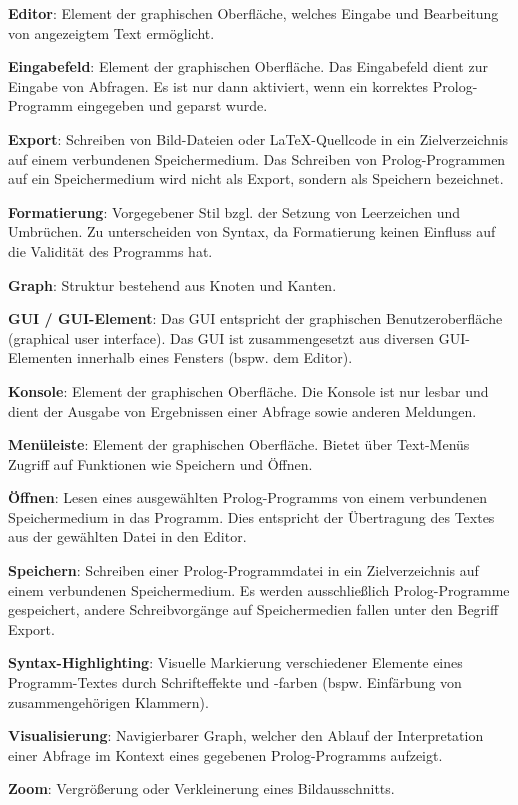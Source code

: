 \documentclass[parskip=full,11pt,twoside]{scrartcl}
\begin{document}
\textbf{Editor}:
Element der graphischen Oberfläche, welches Eingabe und Bearbeitung von angezeigtem Text ermöglicht.

\textbf{Eingabefeld}:
Element der graphischen Oberfläche. Das Eingabefeld dient zur Eingabe von Abfragen. Es ist nur dann aktiviert, wenn ein korrektes Prolog-Programm eingegeben und geparst wurde.

\textbf{Export}:
Schreiben von Bild-Dateien oder LaTeX-Quellcode in ein Zielverzeichnis auf einem verbundenen Speichermedium. Das Schreiben von Prolog-Programmen auf ein Speichermedium wird nicht als Export, sondern als Speichern bezeichnet.

\textbf{Formatierung}:
Vorgegebener Stil bzgl. der Setzung von Leerzeichen und Umbrüchen. Zu unterscheiden von Syntax, da Formatierung keinen Einfluss auf die Validität des Programms hat.

\textbf{Graph}:
Struktur bestehend aus Knoten und Kanten.

\textbf{GUI / GUI-Element}:
Das GUI entspricht der graphischen Benutzeroberfläche (graphical user interface). Das GUI ist zusammengesetzt aus diversen GUI-Elementen innerhalb eines Fensters (bspw. dem Editor).

\textbf{Konsole}:
Element der graphischen Oberfläche. Die Konsole ist nur lesbar und dient der Ausgabe von Ergebnissen einer Abfrage sowie anderen Meldungen. 

\textbf{Menüleiste}:
Element der graphischen Oberfläche. Bietet über Text-Menüs Zugriff auf Funktionen wie Speichern und Öffnen.

\textbf{Öffnen}:
Lesen eines ausgewählten Prolog-Programms von einem verbundenen Speichermedium in das Programm. Dies entspricht der Übertragung des Textes aus der gewählten Datei in den Editor.

\textbf{Speichern}:
Schreiben einer Prolog-Programmdatei in ein Zielverzeichnis auf einem verbundenen Speichermedium. Es werden ausschließlich Prolog-Programme gespeichert, andere Schreibvorgänge auf Speichermedien fallen unter den Begriff Export.

\textbf{Syntax-Highlighting}:
Visuelle Markierung verschiedener Elemente eines Programm-Textes durch Schrifteffekte und -farben (bspw. Einfärbung von zusammengehörigen Klammern).

\textbf{Visualisierung}:
Navigierbarer Graph, welcher den Ablauf der Interpretation einer Abfrage im Kontext eines gegebenen Prolog-Programms aufzeigt.

\textbf{Zoom}:
Vergrößerung oder Verkleinerung eines Bildausschnitts.
\end{document}
